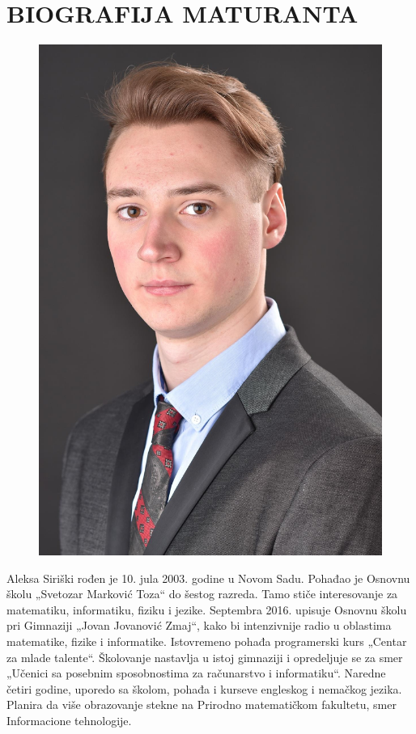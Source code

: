 \documentclass[a4paper,14pt]{article}
\begin{document}
\section*{BIOGRAFIJA MATURANTA}
\begin{figure}
\centering
\includegraphics[width=.90\linewidth]{Maturska}
\end{figure}
Aleksa Siriški rođen je 10. jula 2003. godine u Novom Sadu. Pohađao je Osnovnu školu „Svetozar Marković Toza“ do šestog razreda. Tamo stiče interesovanje za matematiku, informatiku, fiziku i jezike. Septembra 2016. upisuje Osnovnu školu pri Gimnaziji „Jovan Jovanović Zmaj“, kako bi intenzivnije radio u oblastima matematike, fizike i informatike. Istovremeno pohađa programerski kurs „Centar za mlade talente“. Školovanje nastavlja u istoj gimnaziji i opredeljuje se za smer „Učenici sa posebnim sposobnostima za računarstvo i informatiku“. Naredne četiri godine, uporedo sa školom, pohađa i kurseve engleskog i nemačkog jezika. Planira da više obrazovanje stekne na Prirodno matematičkom fakultetu, smer Informacione tehnologije.
\newpage
\end{document}
